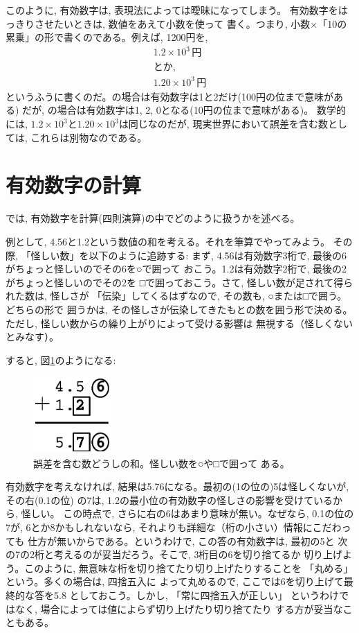 このように, 有効数字は, 表現法によっては曖昧になってしまう。
有効数字をはっきりさせたいときは, 数値をあえて小数を使って
書く。つまり, 小数×「10の累乗」の形で書くのである。例えば, 1200円を, 
\begin{eqnarray}
1.2\times10^3\,\text{円}\label{eq:1200yen3}\\
\text{とか, }\nonumber\\
1.20\times10^3\,\text{円}\label{eq:1200yen4}
\end{eqnarray}
というふうに書くのだ。の場合は有効数字は1と2だけ(100円の位まで意味がある)
だが, の場合は有効数字は1, 2, 0となる(10円の位まで意味がある)。
数学的には, $1.2\times10^3$と$1.20\times10^3$は同じなのだが, 
現実世界において誤差を含む数としては, これらは別物なのである。\\



\section{有効数字の計算}

では, 有効数字を計算(四則演算)の中でどのように扱うかを述べる。

例として, 4.56と1.2という数値の和を考える。それを筆算でやってみよう。
その際, 「怪しい数」を以下のように追跡する: まず, 
4.56は有効数字3桁で, 最後の6がちょっと怪しいのでその6を○で囲って
おこう。1.2は有効数字2桁で, 最後の2がちょっと怪しいのでその2を
□で囲っておこう。さて, 怪しい数が足されて得られた数は, 怪しさが
「伝染」してくるはずなので, その数も, ○または□で囲う。どちらの形で
囲うかは, その怪しさが伝染してきたもとの数を囲う形で決める。
ただし, 怪しい数からの繰り上がりによって受ける影響は
無視する（怪しくないとみなす）。

すると, 図\ref{fig:guard_digit_plus}のようになる:
\begin{figure}[h]
    \centering
    \includegraphics[width=3cm]{guard_digit_plus.eps}
    \caption{誤差を含む数どうしの和。怪しい数を○や□で囲って
ある。}\label{fig:guard_digit_plus}
\end{figure}

有効数字を考えなければ, 結果は5.76になる。最初の(1の位の)5は怪しくないが, その右(0.1の位)
の7は, 1.2の最小位の有効数字の怪しさの影響を受けているから, 怪しい。
この時点で, さらに右の6はあまり意味が無い。なぜなら, 0.1の位の7が, 
6とか8かもしれないなら, それよりも詳細な（桁の小さい）情報にこだわっても
仕方が無いからである。というわけで, この答の有効数字は, 最初の5と
次の7の2桁と考えるのが妥当だろう。そこで, 3桁目の6を切り捨てるか
切り上げよう。このように, 無意味な桁を切り捨てたり切り上げたりすることを
「丸める」という。多くの場合は, 四捨五入に
よって丸めるので, ここでは6を切り上げて最終的な答を5.8
としておこう。しかし, 「常に四捨五入が正しい」
というわけではなく, 場合によっては値によらず切り上げたり切り捨てたり
する方が妥当なこともある。

